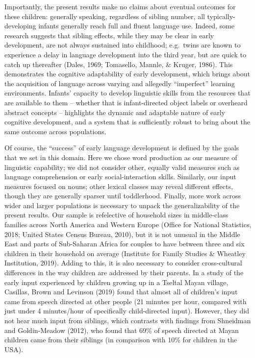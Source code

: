 \documentclass[man,floatsintext]{apa6}
\begin{document}
Importantly, the present results make no claims about eventual outcomes for these children: generally speaking, regardless of sibling number, all typically-developing infants generally reach full and fluent language use. Indeed, some research suggests that sibling effects, while they may be clear in early development, are not always sustained into childhood; e.g.~twins are known to experience a delay in language development into the third year, but are quick to catch up thereafter (Dales, 1969; Tomasello, Mannle, \& Kruger, 1986). This demonstrates the cognitive adaptability of early development, which brings about the acquisition of language across varying and allegedly \enquote{imperfect} learning environments. Infants' capacity to develop linguistic skills from the resources that are available to them -- whether that is infant-directed object labels or overheard abstract concepts -- highlights the dynamic and adaptable nature of early cognitive development, and a system that is sufficiently robust to bring about the same outcome across populations.

Of course, the \enquote{success} of early language development is defined by the goals that we set in this domain. Here we chose word production as our measure of linguistic capability; we did not consider other, equally valid measures such as language comprehension or early social-interaction skills. Similarly, our input measures focused on nouns; other lexical classes may reveal different effects, though they are generally sparser until toddlerhood. Finally, more work across wider and larger populations is necessary to unpack the generalizability of the present results. Our sample is refelective of household sizes in middle-class families across North America and Western Europe (Office for National Statistics, 2018; United States Census Bureau, 2010), but it is not unusual in the Middle East and parts of Sub-Saharan Africa for couples to have between three and six children in their household on average (Institute for Family Studies \& Wheatley Institution, 2019). Adding to this, it is also necessary to consider cross-cultural differences in the way children are addressed by their parents. In a study of the early input experienced by children growing up in a Tseltal Mayan village, Casillas, Brown and Levinson (2019) found that almost all of children's input came from speech directed at other people (21 minutes per hour, compared with just under 4 minutes/hour of specifically child-directed input). However, they did not hear much input from siblings, which contrasts with findings from Shneidman and Goldin-Meadow (2012), who found that 69\% of speech directed at Mayan children came from their siblings (in comparison with 10\% for children in the USA).
\end{document}

